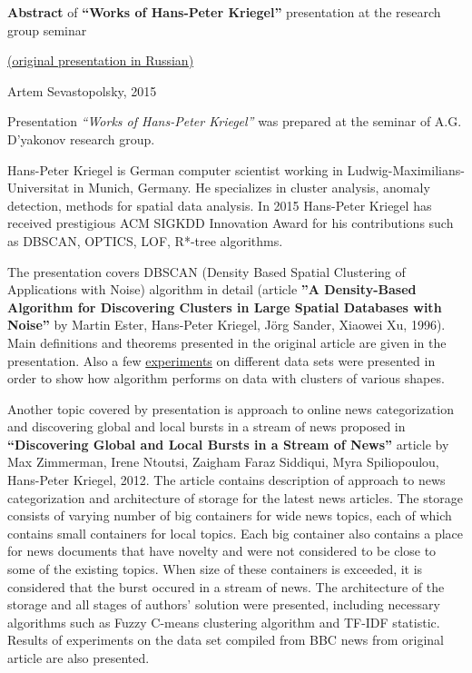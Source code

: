 \documentclass[11pt]{article}
\begin{document}
	{\large {\bf Abstract} of {\bf``Works of Hans-Peter Kriegel''} presentation at the research group seminar
	
	 \href{http://www.machinelearning.ru/wiki/images/4/4e/Sevastopolsky_-_report_H-P_Kriegel.pdf}{(original presentation in Russian)}
	\newline
	
	{Artem Sevastopolsky, 2015}}
	\newline
	\newline
	\newline
	\par
	Presentation \emph{``Works of Hans-Peter Kriegel''} was prepared at the seminar of A.G. D'yakonov research group. \newline
	
	Hans-Peter Kriegel is German computer scientist working in Ludwig-Maximilians-Universitat in Munich, Germany. He specializes in cluster analysis, anomaly detection, methods for spatial data analysis. In 2015 Hans-Peter Kriegel has received prestigious ACM SIGKDD Innovation Award for his contributions such as DBSCAN, OPTICS, LOF, R*-tree algorithms.  \newline
	
	The presentation covers DBSCAN (Density Based Spatial Clustering of Applications with Noise) algorithm in detail (article  {\bf ''A Density-Based Algorithm for Discovering Clusters in Large Spatial Databases with Noise''} by Martin Ester, Hans-Peter Kriegel, Jörg Sander, Xiaowei Xu, 1996). Main definitions and theorems presented in the original article are given in the presentation. Also a few \href{http://www.naftaliharris.com/blog/visualizing-dbscan-clustering/}{experiments} on different data sets were presented in order to show how algorithm performs on data with clusters of various shapes. \newline
	
	Another topic covered by presentation is approach to online news categorization and discovering global and local bursts in a stream of news proposed in {\bf ``Discovering Global and Local Bursts in a Stream of News''} article by Max Zimmerman, Irene Ntoutsi, Zaigham Faraz Siddiqui, Myra Spiliopoulou, Hans-Peter Kriegel, 2012. The article contains description of approach to news categorization and architecture of storage for the latest news articles. The storage consists of varying number of big containers for wide news topics, each of which contains small containers for local topics. Each big container also contains a place for news documents that have novelty and were not considered to be close to some of the existing topics. When size of these containers is exceeded, it is considered that the burst occured in a stream of news. The architecture of the storage and all stages of authors' solution were presented, including necessary algorithms such as Fuzzy C-means clustering algorithm and TF-IDF statistic. Results of experiments on the data set compiled from BBC news from original article are also presented.
\end{document}

